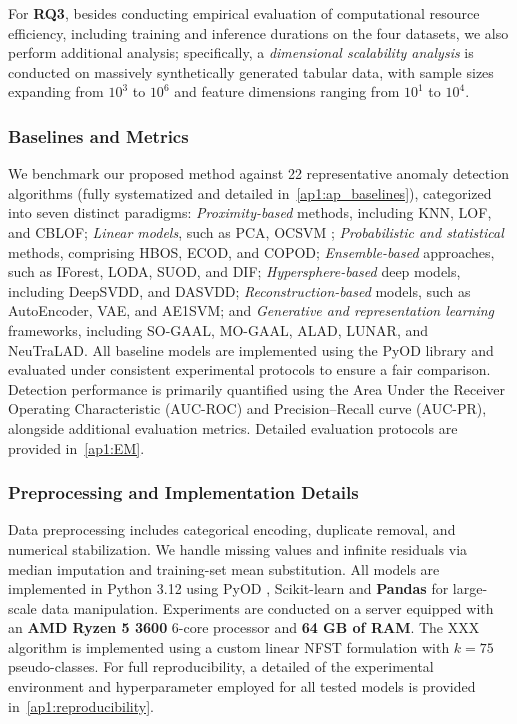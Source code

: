 \documentclass[final,twocolumn,10pt]{elsarticle}
\begin{document}
For \textbf{RQ3}, besides conducting empirical evaluation of computational resource efficiency, including training and inference durations on the four datasets, we also perform additional analysis; specifically, a \textit{dimensional scalability analysis} is conducted on massively synthetically generated tabular data, with sample sizes expanding from $10^3$ to $10^6$ and feature dimensions ranging from $10^1$ to $10^4$.
 
\subsubsection{Baselines and Metrics}

We benchmark our proposed method against 22 representative anomaly detection algorithms (fully systematized and detailed in~\ref{ap1:ap_baselines}), categorized into seven distinct paradigms:
\textit{Proximity-based} methods, including KNN, LOF, and CBLOF;
\textit{Linear models}, such as PCA, OCSVM ;
\textit{Probabilistic and statistical} methods, comprising HBOS, ECOD, and COPOD;
\textit{Ensemble-based} approaches, such as IForest, LODA, SUOD, and DIF;
\textit{Hypersphere-based} deep models, including DeepSVDD, and DASVDD;
\textit{Reconstruction-based} models, such as AutoEncoder, VAE, and AE1SVM; and
\textit{Generative and representation learning} frameworks, including SO-GAAL, MO-GAAL, ALAD, LUNAR, and NeuTraLAD. All baseline models are implemented using the PyOD library \cite{zhao2019pyod} and evaluated under consistent experimental protocols to ensure a fair comparison. Detection performance is primarily quantified using the Area Under the Receiver Operating Characteristic (AUC-ROC) and Precision–Recall curve (AUC-PR), alongside additional evaluation metrics. Detailed evaluation protocols are provided in~\ref{ap1:EM}.


\subsubsection{Preprocessing and Implementation Details}
Data preprocessing includes categorical encoding, duplicate removal, and numerical stabilization. We handle missing values and infinite residuals via median imputation and training-set mean substitution. All models are implemented in Python 3.12 using PyOD \cite{zhao2019pyod}, Scikit-learn \cite{pedregosa2011scikit} and \textbf{Pandas} for large-scale data manipulation. Experiments are conducted on a server equipped with an \textbf{AMD Ryzen 5 3600} 6-core processor and \textbf{64 GB of RAM}. The XXX algorithm is implemented using a custom linear NFST formulation with $k=75$ pseudo-classes. For full reproducibility, a detailed of the experimental environment and hyperparameter employed for all tested models is provided in~\ref{ap1:reproducibility}.
\end{document}
